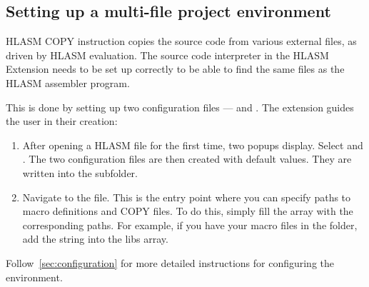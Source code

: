 \subsection{Setting up a multi-file project environment}
HLASM COPY instruction copies the source code from various external files, as driven by HLASM evaluation. The source code interpreter in the HLASM Extension needs to be set up correctly to be able to find the same files as the HLASM assembler program. 

This is done by setting up two configuration files ---  and . The extension guides the user in their creation:
\begin{enumerate}
	\item After opening a HLASM file for the first time, two popups display. Select  and . The two configuration files are then created with default values. They are written into the  subfolder.
	\item Navigate to the  file. This is the entry point where you can specify paths to macro definitions and COPY files. To do this, simply fill the  array with the corresponding paths. For example, if you have your macro files in the  folder, add the string  into the libs array.
\end{enumerate}

Follow~\cref{sec:configuration} for more detailed instructions for configuring the environment.
